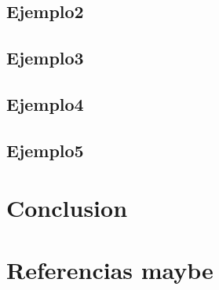 \documentclass[runningheads]{llncs} %
\begin{document}
\subsection{Ejemplo2}
\subsection{Ejemplo3}
\subsection{Ejemplo4}
\subsection{Ejemplo5}
\section{Conclusion}
\section{Referencias maybe}

\newpage
\printbibliography
\end{document}

